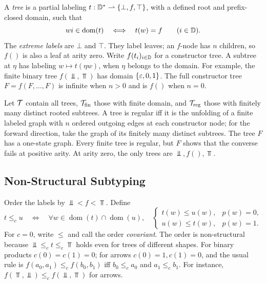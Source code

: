 A \emph{tree} is a partial labeling $t:\mathbb{D}^*\rightharpoonup\{\bot,f,\top\}$,
with a defined root and prefix-closed domain, such that
\begin{equation}\label{eq:g2}
 wi\in\operatorname{dom}(t)\quad\Longleftrightarrow\quad t(w)=f
 \qquad(i\in\mathbb{D}).
\end{equation}
The \emph{extreme labels} are $\bot$ and $\top$. They label leaves;
an $f$-node has $n$ children, so $f()$ is also a leaf at arity zero.
Write $f(t_i)_{i\in\mathbb{D}}$ for a constructor tree. A subtree at $\eta$ has
labeling $w\mapsto t(\eta w)$, when $\eta$ belongs to the domain.
For example, the finite binary tree $f(\Bot,\Top)$ has domain
$\{\varepsilon,0,1\}$. The full constructor tree $F=f(F,\ldots,F)$ is infinite
when $n>0$ and is $f()$ when $n=0$.

Let $\mathcal{T}$ contain all trees, $\mathcal{T}_{\mathrm{fin}}$ those with finite
domain, and $\mathcal{T}_{\mathrm{reg}}$ those with finitely many distinct rooted
subtrees. A tree is regular iff it is the unfolding of a finite labeled graph
with $n$ ordered outgoing edges at each constructor node; for the forward
direction, take the graph of its finitely many distinct subtrees. The tree $F$ has a one-state
graph. Every finite tree is regular, but $F$ shows that the converse fails
at positive arity. At arity zero, the only trees are $\Bot,f(),\Top$.

\subsection{Non-Structural Subtyping}
Order the labels by $\Bot<f<\Top$. Define
\begin{equation}\label{eq:g3}
 t\le_c u\quad\Longleftrightarrow\quad
 \forall w\in\operatorname{dom}(t)\cap\operatorname{dom}(u),\quad
 \begin{cases}t(w)\le u(w),&p(w)=0,\\u(w)\le t(w),&p(w)=1.\end{cases}
\end{equation}
For $c=0$, write $\le$ and call the order \emph{covariant}.
The order is non-structural because $\Bot\le_c t\le_c\Top$ holds even for
trees of different shapes. For binary products $c(0)=c(1)=0$; for arrows
$c(0)=1,c(1)=0$, and the usual rule is
$f(a_0,a_1)\le_c f(b_0,b_1)$ iff $b_0\le_c a_0$ and $a_1\le_c b_1$.
For instance, $f(\Top,\Bot)\le_c f(\Bot,\Top)$ for arrows.

